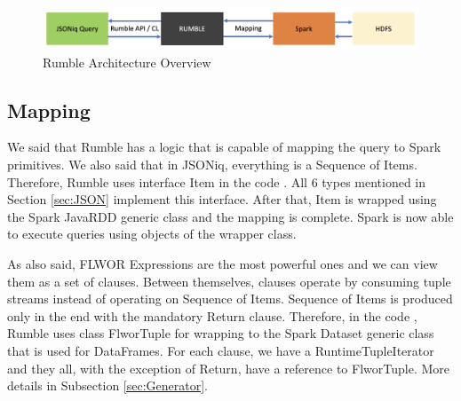 \begin{figure}[h!]
	\vspace*{-1mm}
	\includegraphics[width=\linewidth]{rumble_architecture.png}
	\caption{Rumble Architecture Overview}
	\label{fig:Rumble_Architecture}
\end{figure}

\subsection{Mapping}
\label{sec:RumbleMapping}
We said that Rumble has a logic that is capable of mapping the query to Spark primitives. We also said that in JSONiq, everything is a Sequence of Items. Therefore, Rumble uses interface Item in the code \cite{RumbleRepository}. All 6 types mentioned in Section \ref{sec:JSON} implement this interface. After that, Item is wrapped using the Spark JavaRDD generic class and the mapping is complete. Spark is now able to execute queries using objects of the wrapper class.

As also said, FLWOR Expressions are the most powerful ones and we can view them as a set of clauses. Between themselves, clauses operate by consuming tuple streams instead of operating on Sequence of Items. Sequence of Items is produced only in the end with the mandatory Return clause. Therefore, in the code \cite{RumbleRepository}, Rumble uses class FlworTuple for wrapping to the Spark Dataset generic class that is used for DataFrames. For each clause, we have a RuntimeTupleIterator and they all, with the exception of Return, have a reference to FlworTuple. More details in Subsection \ref{sec:Generator}.

